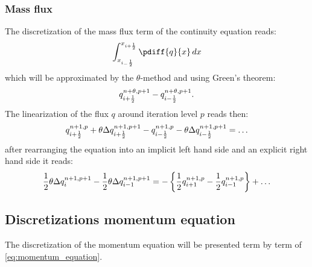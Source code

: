 \subsubsection{Mass flux}
The discretization of the mass flux term of the continuity equation reads:
\begin{align}
    \int^{x_{i+\half}}_{x_{i_-\half}} \pdiff{q}{x} \,dx
\end{align}
which will be approximated by the $\theta$-method and using Green's theorem:
\begin{align}
q^{n+\theta, p+1}_{i+\frac{1}{2}} - q^{n+\theta, p+1}_{i-\frac{1}{2}}.
\end{align}
The linearization of the flux $q$ around iteration level $p$ reads then:
\begin{align}
    q^{n+1,p}_{i+\frac{1}{2}}  + \theta \Delta q^{n+1, p+1}_{i+\frac{1}{2}}
    - q^{n+1,p}_{i-\frac{1}{2}}  - \theta \Delta q^{n+1, p+1}_{i-\frac{1}{2}} = \ldots
\end{align}
after rearranging the equation into an implicit left hand side and an explicit right hand side  it reads:
\begin{align}
\frac{1}{2}  \theta \Delta q^{n+1, p+1}_{i} - \frac{1}{2} \theta \Delta q^{n+1, p+1}_{i-1} = -\left\{ \frac{1}{2} q^{n+1,p}_{i+1}  - \frac{1}{2} q^{n+1,p}_{i-1} \right\} + \ldots
\end{align}

\subsection{Discretizations momentum equation}
The discretization of the momentum equation will be presented term by term of \autoref{eq:momentum_equation}.
